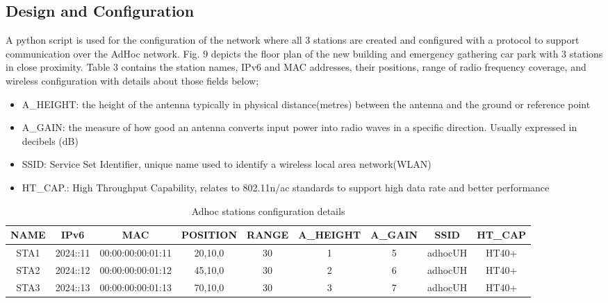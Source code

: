 \documentclass{article}
\begin{document}
\subsection{Design and Configuration}
A python script is used for the configuration of the network where all 3 stations are created and configured with a protocol to support communication over the AdHoc network. Fig. 9 depicts the floor plan of the new building and emergency gathering car park with 3 stations in close proximity. Table 3 contains the station names, IPv6 and MAC addresses, their positions, range of radio frequency coverage, and wireless configuration with details about those fields below; 
	\begin{itemize}
		\item A\_HEIGHT: the height of the antenna typically in physical distance(metres) between the antenna and the ground or reference point
		\item A\_GAIN: the measure of how good an antenna converts input power into radio waves in a specific direction. Usually expressed in decibels (dB)
		\item SSID: Service Set Identifier, unique name used to identify a wireless local area network(WLAN)
		\item HT\_CAP.: High Throughput Capability, relates to 802.11n/ac standards to support high data rate and better performance 
	\end{itemize}
    	\begin{table}[h]
		\small
        		\begin{tabular}{|c|c|c|c|c|c|c|c|c|}
        			\hline
        			NAME & IPv6 & MAC & POSITION & RANGE & A\_HEIGHT & A\_GAIN & SSID & HT\_CAP\\
        			\hline
        			STA1 & 2024::11 & 00:00:00:00:01:11 & 20,10,0 & 30 & 1 & 5 & adhocUH & HT40+ \\
        			STA2 & 2024::12 & 00:00:00:00:01:12 & 45,10,0 & 30 & 2 & 6 & adhocUH & HT40+ \\
        			STA3 & 2024::13 & 00:00:00:00:01:13 & 70,10,0 & 30 & 3 & 7 & adhocUH & HT40+ \\
        			\hline
        		\end{tabular}
       	 	\caption{Adhoc stations configuration details}
        		\label{tab:3}
    	\end{table}
\newpage
\end{document}
